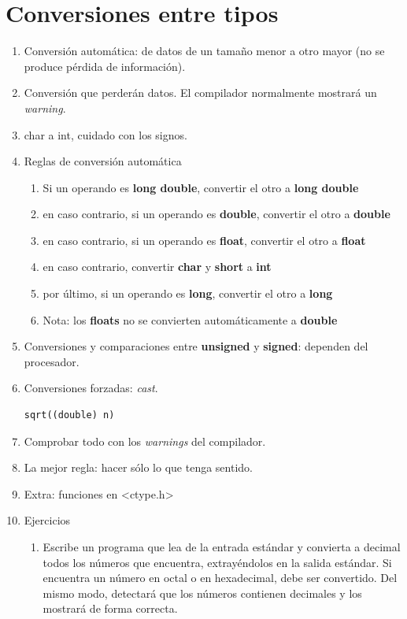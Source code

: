 \documentclass[a4paper,oneside]{article}
\begin{document}
\section{Conversiones entre tipos}
  \begin{enumerate}
  \item Conversión automática: de datos de un tamaño menor a otro mayor (no se produce pérdida de información).
  \item Conversión que perderán datos. El compilador normalmente mostrará un \textit{warning}.
  \item char a int, cuidado con los signos.
  \item Reglas de conversión automática
    \begin{enumerate}
    \item Si un operando es \textbf{long double}, convertir el otro a \textbf{long double}
    \item en caso contrario, si un operando es \textbf{double}, convertir el otro a \textbf{double}
    \item en caso contrario, si un operando es \textbf{float}, convertir el otro a \textbf{float}
    \item en caso contrario, convertir \textbf{char} y \textbf{short} a \textbf{int}
    \item por último, si un operando es \textbf{long}, convertir el otro a \textbf{long}
    \item Nota: los \textbf{floats} no se convierten automáticamente a \textbf{double}
    \end{enumerate}
  \item Conversiones y comparaciones entre \textbf{unsigned} y \textbf{signed}: dependen del procesador.
  \item Conversiones forzadas: \textit{cast}.

    \begin{verbatim}
sqrt((double) n)
    \end{verbatim}
  \item Comprobar todo con los \textit{warnings} del compilador.
  \item La mejor regla: hacer sólo lo que tenga sentido.
  \item Extra: funciones en <ctype.h>
  \item Ejercicios
    \begin{enumerate}
    \item Escribe un programa que lea de la entrada estándar y convierta a decimal todos los números que encuentra, extrayéndolos en la salida estándar. Si encuentra un número en octal o en hexadecimal, debe ser convertido. Del mismo modo, detectará que los números contienen decimales y los mostrará de forma correcta.
    \end{enumerate}
  \end{enumerate}
\end{document}
